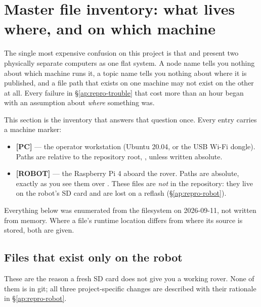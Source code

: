\section{Master file inventory: what lives where, and on which machine}
\label{ap:repro-inventory}

The single most expensive confusion on this project is that  and  present two physically separate computers as
one flat system. A node name tells you nothing about which machine runs it,
a topic name tells you nothing about where it is published, and a file path
that exists on one machine may not exist on the other at all. Every failure
in \S\ref{ap:repro-trouble} that cost more than an hour began with an
assumption about \emph{where} something was.

This section is the inventory that answers that question once. Every entry
carries a machine marker:

\begin{itemize}[leftmargin=1.4em]
\item \textbf{[PC]} --- the operator workstation (Ubuntu 20.04, 
  or the USB Wi-Fi dongle). Paths are relative to the repository root,
  , unless written absolute.
\item \textbf{[ROBOT]} --- the Raspberry Pi 4 aboard the rover. Paths are
  absolute, exactly as you see them over . These
  files are \emph{not} in the repository: they live on the robot's SD card
  and are lost on a reflash (\S\ref{ap:repro-robot}).
\end{itemize}

\noindent Everything below was enumerated from the filesystem on
2026-09-11, not written from memory. Where a file's runtime location differs
from where its source is stored, both are given.

\subsection{Files that exist only on the robot}
\label{ap:repro-inv-robot}

These are the reason a fresh SD card does not give you a working rover. None
of them is in git; all three project-specific changes are described with
their rationale in \S\ref{ap:repro-robot}.

